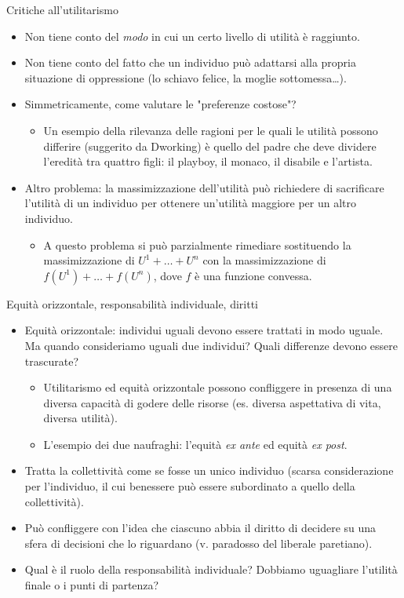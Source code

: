 \documentclass[aspectratio=64,11pt]{beamer}
\begin{document}
\begin{frame}{Critiche all'utilitarismo}
\begin{itemize}
\item Non tiene conto del \emph{modo} in cui un certo livello di utilità è raggiunto.
\item Non tiene conto del fatto che un individuo può adattarsi alla propria
situazione di oppressione (lo schiavo felice, la moglie sottomessa\ldots{}).
\item Simmetricamente, come valutare le "preferenze costose"?
\begin{itemize}
\item Un esempio della rilevanza delle ragioni per le quali le utilità possono
  differire (suggerito da Dworking) è quello del padre che deve dividere l'eredità tra
  quattro figli: il playboy, il monaco, il disabile e l'artista.
\end{itemize}
\item Altro problema: la massimizzazione dell'utilità può richiedere di
sacrificare l'utilità di un individuo per ottenere un'utilità maggiore per
un altro individuo.
\begin{itemize}
\item A questo problema si può parzialmente rimediare sostituendo la massimizzazione di
$U^1+\dots+U^n$ con la massimizzazione di $f(U^1)+\dots+f(U^n)$, dove $f$
è una funzione convessa.
\end{itemize}
\end{itemize}
\end{frame}

\begin{frame}{Equità orizzontale, responsabilità individuale, diritti}
\begin{itemize}
\item \alert{Equità orizzontale}: individui uguali devono essere trattati in modo
uguale. Ma quando consideriamo uguali due individui? Quali differenze
devono essere trascurate?
\begin{itemize}
\item Utilitarismo ed equità orizzontale possono confliggere in presenza di una
diversa capacità di godere delle risorse (es. diversa aspettativa di vita,
diversa utilità).
\item L'esempio dei due naufraghi: l'equità \emph{ex ante} ed equità \emph{ex post}.
\end{itemize}
\item Tratta la collettività come se fosse un unico individuo (scarsa
considerazione per l'individuo, il cui benessere può essere subordinato a
quello della collettività).
\item Può confliggere con l'idea che ciascuno abbia il diritto di decidere su una
sfera di decisioni che lo riguardano (v. paradosso del liberale paretiano).
\item Qual è il ruolo della responsabilità individuale? Dobbiamo uguagliare
l'utilità finale o i punti di partenza?
\end{itemize}
\end{frame}
\end{document}
